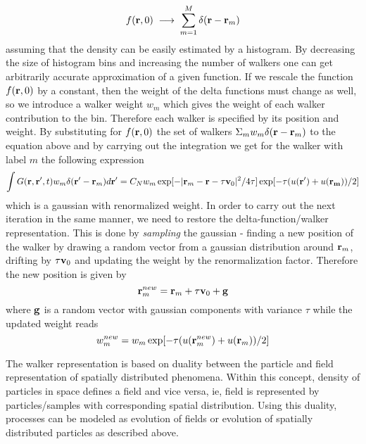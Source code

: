 \documentclass[fleqn,12pt,twoside]{article}
\begin{document}
\begin{equation}
f({\bf r},0)\;\longrightarrow \;\sum_{m=1}^M \delta({\bf r}-{\bf r}_m)
\end{equation}
assuming that the density can be easily estimated by a histogram.
By decreasing the size of histogram bins and
increasing the number of walkers one can get 
arbitrarily accurate approximation of a given function.
If we rescale the function $f({\bf r},0)$ by a constant, 
then the weight of the delta functions must change as well,
 so we introduce a walker weight $w_m$
which gives the weight of each walker contribution to the bin.
Therefore each walker is specified by its position and weight.
By substituting for  
 $f({\bf r},0)$ the set of walkers $ \Sigma_m w_m\delta({\bf r}-{\bf r}_m)$ 
to the equation above and by carrying out
the integration we get for the walker with label $m$ the following
expression 
\begin{equation}
\int G({\bf r}, {\bf r'}, t)
w_m\delta({\bf r'}-{\bf r}_m)d{\bf r'}=
C_N w_m \exp[-|{\bf r}_m-{\bf r}-\tau{\bf v}_0|^2/4\tau]
\exp[-\tau(u({\bf r'})+u({\bf r_m}))/2]
\end{equation}
which is a gaussian with renormalized weight. 
In order to carry out the next iteration 
in the same manner, we need to restore the delta-function/walker
representation.  This is done 
by {\em sampling} the gaussian - finding a new position of the walker
by drawing a random vector from a gaussian distribution around ${\bf r}_m$,
drifting by $\tau{\bf v}_0$ and 
updating the weight by the renormalization factor. 
Therefore
 the new position is given by
\begin{equation}
{\bf r}_m^{new}={\bf r}_m + \tau {\bf v}_0 + {\bf g}
\end{equation}
where ${\bf g}$ is a random vector with gaussian components with
variance $\tau$ 
 while the updated weight reads
\begin{equation}
w_m^{new}=w_m \exp[-\tau(u({\bf r}_m^{new})+u({\bf r}_m))/2]
\end{equation}

\noindent
The walker representation is based on duality between the particle and field
representation of spatially distributed phenomena.
Within this concept, density of particles in
space defines a field and vice versa, ie, field is represented by
particles/samples with corresponding spatial distribution. Using
this duality, processes can be modeled as evolution of fields or evolution
of spatially distributed particles as described above.
\end{document}
